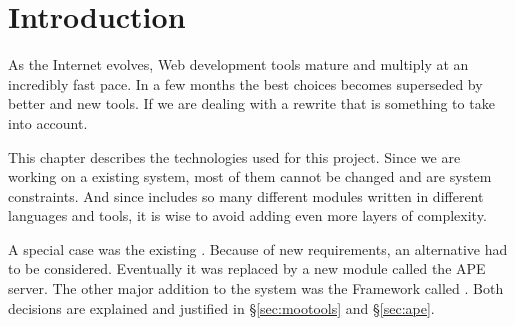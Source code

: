 \section{Introduction} %
\label{sec:intro2}

As the Internet evolves, Web development tools mature and multiply at an incredibly fast pace.
In a few months the best choices becomes superseded by better and new tools.
If we are dealing with a rewrite that is something to take into account.

This chapter describes the technologies used for this project.
Since we are working on a existing system, most of them cannot be changed and are system constraints.
And since  includes so many different modules written in different languages and tools, it is wise to avoid adding even more layers of complexity.

A special case was the existing .
Because of new requirements, an alternative had to be considered.
Eventually it was replaced by a new module called the \ac{APE} server.
The other major addition to the system was the  Framework called .
Both decisions are explained and justified in \S\ref{sec:mootools} and  \S\ref{sec:ape}.

